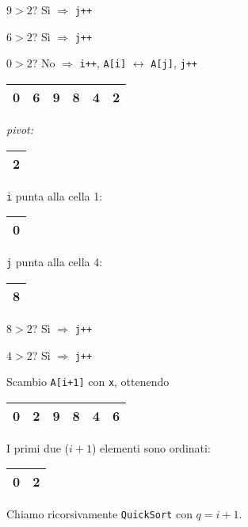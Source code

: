 $9 > 2$? Sì $\Rightarrow$ \texttt{j++} \par
$6 > 2$? Sì $\Rightarrow$ \texttt{j++} \par
$0 > 2$? No $\Rightarrow$ \texttt{i++}, \texttt{A[i]} $\leftrightarrow$ \texttt{A[j]}, \texttt{j++} \par

\begin{center}
	\begin{tabular}{|l|l|l|l|l|l|}
		\hline
		0 & 6 & 9 & 8 & 4 & 2 \\
		\hline
	\end{tabular}
	\hspace{1cm}
	\emph{pivot: }
	\begin{tabular}{|l|}
		\hline
		2 \\
		\hline
	\end{tabular}
\end{center}

\texttt{i} punta alla cella 1: 
\begin{tabular}{|l|}
	\hline
	0 \\
	\hline
\end{tabular} \par
\texttt{j} punta alla cella 4:
\begin{tabular}{|l|}
	\hline
	8 \\
	\hline
\end{tabular}

$8 > 2$? Sì $\Rightarrow$ \texttt{j++} \par
$4 > 2$? Sì $\Rightarrow$ \texttt{j++} \par
Scambio \texttt{A[i+1]} con \texttt{x}, ottenendo \par

\begin{center}
	\begin{tabular}{|l|l|l|l|l|l|}
		\hline
		0 & 2 & 9 & 8 & 4 & 6 \\
		\hline
	\end{tabular}
\end{center}

I primi due ($i+1$) elementi sono ordinati: 
\begin{center}
	\begin{tabular}{|l|l|}
		\hline
		0 & 2 \\
		\hline
	\end{tabular}
\end{center}

Chiamo ricorsivamente \texttt{QuickSort} con $q = i + 1$.

